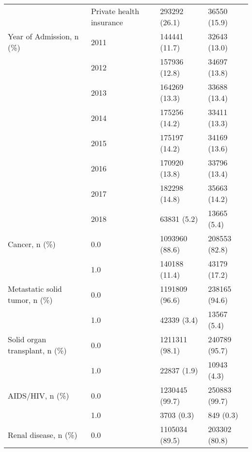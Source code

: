 \begin{tabular}{llll}
                                       & Private health insurance &                         293292 (26.1) &       36550 (15.9) \\
Year of Admission, n (\%) & 2011 &                         144441 (11.7) &       32643 (13.0) \\
                                       & 2012 &                         157936 (12.8) &       34697 (13.8) \\
                                       & 2013 &                         164269 (13.3) &       33688 (13.4) \\
                                       & 2014 &                         175256 (14.2) &       33411 (13.3) \\
                                       & 2015 &                         175197 (14.2) &       34169 (13.6) \\
                                       & 2016 &                         170920 (13.8) &       33796 (13.4) \\
                                       & 2017 &                         182298 (14.8) &       35663 (14.2) \\
                                       & 2018 &                           63831 (5.2) &        13665 (5.4) \\
Cancer, n (\%) & 0.0 &                        1093960 (88.6) &      208553 (82.8) \\
                                       & 1.0 &                         140188 (11.4) &       43179 (17.2) \\
Metastatic solid tumor, n (\%) & 0.0 &                        1191809 (96.6) &      238165 (94.6) \\
                                       & 1.0 &                           42339 (3.4) &        13567 (5.4) \\
Solid organ transplant, n (\%) & 0.0 &                        1211311 (98.1) &      240789 (95.7) \\
                                       & 1.0 &                           22837 (1.9) &        10943 (4.3) \\
AIDS/HIV, n (\%) & 0.0 &                        1230445 (99.7) &      250883 (99.7) \\
                                       & 1.0 &                            3703 (0.3) &          849 (0.3) \\
Renal disease, n (\%) & 0.0 &                        1105034 (89.5) &      203302 (80.8) \\

\end{tabular}
